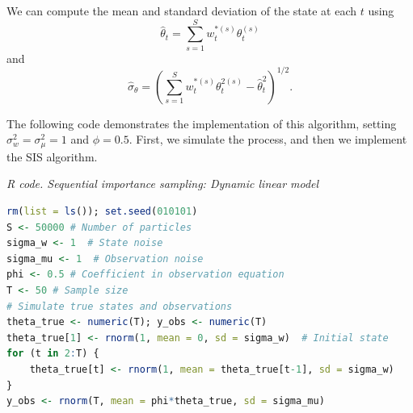 We can compute the mean and standard deviation of the state at each $t$ using  
\[
\hat{\theta}_t = \sum_{s=1}^S w_t^{*(s)} \theta_t^{(s)}
\]  
and  
\[
\hat{\sigma}_{\theta} = \left(\sum_{s=1}^S w_t^{*(s)} \theta_t^{2(s)} - \hat{\theta}_t^2\right)^{1/2}.
\]  

The following code demonstrates the implementation of this algorithm, setting $\sigma_w^2=\sigma_{\mu}^2=1$ and $\phi=0.5$. First, we simulate the process, and then we implement the SIS algorithm.

\begin{tcolorbox}[enhanced,width=4.67in,center upper,
	fontupper=\large\bfseries,drop shadow southwest,sharp corners]
	\textit{R code. Sequential importance sampling: Dynamic linear model}
	\begin{VF}
		\begin{lstlisting}[language=R]
rm(list = ls()); set.seed(010101)
S <- 50000 # Number of particles
sigma_w <- 1  # State noise
sigma_mu <- 1  # Observation noise
phi <- 0.5 # Coefficient in observation equation
T <- 50 # Sample size
# Simulate true states and observations
theta_true <- numeric(T); y_obs <- numeric(T)
theta_true[1] <- rnorm(1, mean = 0, sd = sigma_w)  # Initial state
for (t in 2:T) {
	theta_true[t] <- rnorm(1, mean = theta_true[t-1], sd = sigma_w)
}
y_obs <- rnorm(T, mean = phi*theta_true, sd = sigma_mu)
\end{lstlisting}
	\end{VF}
\end{tcolorbox} 

